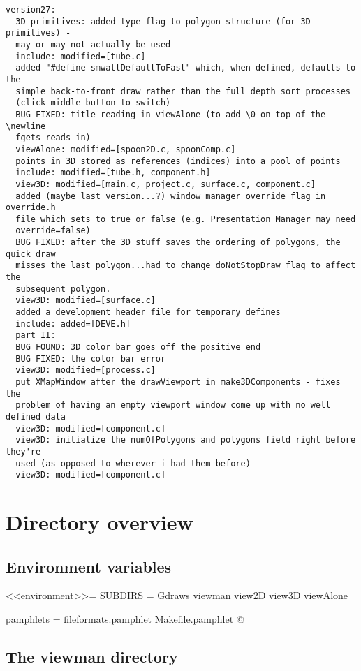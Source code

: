 \documentclass{article}
\begin{document}
\begin{verbatim}
version27:
  3D primitives: added type flag to polygon structure (for 3D primitives) -
  may or may not actually be used
  include: modified=[tube.c]
  added "#define smwattDefaultToFast" which, when defined, defaults to the
  simple back-to-front draw rather than the full depth sort processes
  (click middle button to switch)
  BUG FIXED: title reading in viewAlone (to add \0 on top of the \newline
  fgets reads in)
  viewAlone: modified=[spoon2D.c, spoonComp.c]
  points in 3D stored as references (indices) into a pool of points
  include: modified=[tube.h, component.h]
  view3D: modified=[main.c, project.c, surface.c, component.c]
  added (maybe last version...?) window manager override flag in override.h
  file which sets to true or false (e.g. Presentation Manager may need
  override=false)
  BUG FIXED: after the 3D stuff saves the ordering of polygons, the quick draw
  misses the last polygon...had to change doNotStopDraw flag to affect the
  subsequent polygon.
  view3D: modified=[surface.c]
  added a development header file for temporary defines
  include: added=[DEVE.h]
  part II:
  BUG FOUND: 3D color bar goes off the positive end
  BUG FIXED: the color bar error
  view3D: modified=[process.c]
  put XMapWindow after the drawViewport in make3DComponents - fixes the
  problem of having an empty viewport window come up with no well defined data
  view3D: modified=[component.c]
  view3D: initialize the numOfPolygons and polygons field right before they're
  used (as opposed to wherever i had them before)
  view3D: modified=[component.c]
\end{verbatim}

\section{Directory overview}

\subsection{Environment variables}

<<environment>>=
SUBDIRS = Gdraws viewman view2D view3D viewAlone

pamphlets = fileformats.pamphlet Makefile.pamphlet
@

\subsection{The viewman directory}
\end{document}

